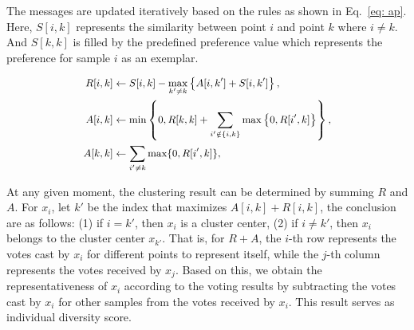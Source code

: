 The messages are updated iteratively based on the rules as shown in Eq.~\ref{eq: ap}.
Here, \(S[i,k]\) represents the similarity between point \(i\) and point \(k\) where $i \neq k$. And $S[k,k]$ is filled by the predefined preference value which represents the preference for sample $i$ as an exemplar.

\begin{equation}
\small
\label{eq: ap}
    \begin{aligned}
        R[i, k] &\leftarrow S[i, k] - \max_{k' \neq k} \left\{A[i, k'] + S[i, k']\right\}, \\
        A[i, k] &\leftarrow \min \left\{0, R[k, k] + \sum_{i' \notin \{i, k\}} \max \left\{0, R[i', k]\right\}\right\}, \\
        A[k, k] &\leftarrow \sum_{i' \neq k} \max \{0, R[i', k]\}, \\
    \end{aligned}
\end{equation}

At any given moment, the clustering result can be determined by summing $R$ and $A$. For $x_i$, let $k'$ be the index that maximizes $A[i,k] + R[i,k]$, the conclusion are as follows: (1) if $i=k'$, then $x_i$ is a cluster center, (2) if $i \neq k'$, then $x_i$ belongs to the cluster center $x_{k'}$. That is, for $R+A$, the $i$-th row represents the votes cast by $x_i$ for different points to represent itself, while the $j$-th column represents the votes received by $x_j$. Based on this, we obtain the representativeness of $x_i$ according to the voting results by subtracting the votes cast by $x_i$ for other samples from the votes received by $x_i$. This result serves as individual diversity score.


